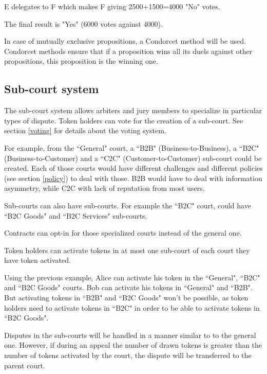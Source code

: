 \documentclass[12 pt]{article}
\begin{document}
E delegates to F which makes F giving 2500+1500=4000 "No" votes.

The final result is "Yes" (6000 votes against 4000).


In case of mutually exclusive propositions, a Condorcet method will be used. Condorcet methods ensure that if a proposition wins all its duels against other propositions, this proposition is the winning one. 


\subsection{Sub-court system}

The sub-court system allows arbiters and jury members to specialize in particular types of dispute. Token holders can vote for the creation of a sub-court. See section \ref{voting} for details about the voting system. 

For example, from the ``General" court, a ``B2B" (Business-to-Business), a ``B2C" (Business-to-Customer) and a ``C2C" (Customer-to-Customer) sub-court could be created. Each of those courts would have different challenges and different policies (see section \ref{policy}) to deal with those. B2B would have to deal with information asymmetry, while C2C with lack of reputation from most users.

Sub-courts can also have sub-courts. For example the ``B2C" court, could have ``B2C Goods" and ``B2C Services" sub-courts.

Contracts can opt-in for those specialized courts instead of the general one.

Token holders can activate tokens in at most one sub-court of each court they have token activated.

Using the previous example, Alice can activate his token in the ``General", ``B2C" and ``B2C Goods" courts. Bob can activate his tokens in ``General" and ``B2B". But activating tokens in ``B2B" and ``B2C Goods" won't be possible, as token holders need to activate tokens in ``B2C" in order to be able to activate tokens in ``B2C Goods".


Disputes in the sub-courts will be handled in a manner similar to to the general one. However, if during an appeal the number of drawn tokens is greater than the number of tokens activated by the court, the dispute will be transferred to the parent court.
\end{document}
